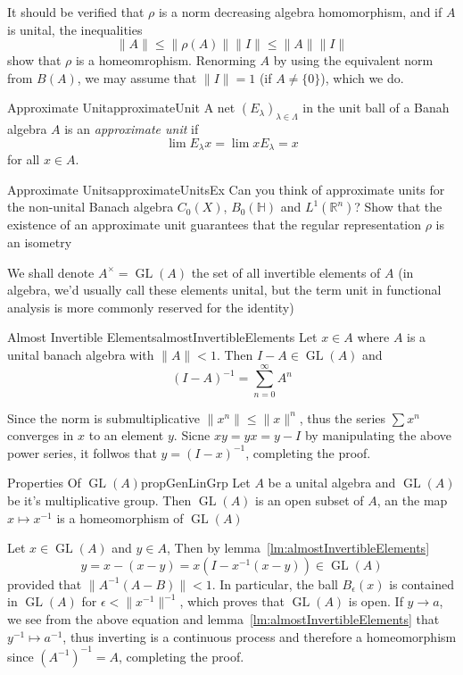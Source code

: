 \documentclass[oneside]{book}
\newcommand{\R}{\mathbb{R}}
\renewcommand{\H}{\mathbb{H}}
\newcommand{\GL}{\operatorname{GL}}
\begin{document}
It should be verified that $\rho$ is a norm decreasing algebra homomorphism, and if $A$ is unital, the inequalities
\[
	\|A\| \le \|\rho(A)\|\|I\| \le \|A\|\|I\|
\]
show that $\rho$ is a homeomrophism. Renorming $A$ by using the equivalent norm from $B(A)$, we may assume that $\|I\|
= 1$ (if $A \ne \{0\}$), which we do.


\begin{defn}{Approximate Unit}{approximateUnit}
	A net $(E_\lambda)_{\lambda \in \Lambda}$ in the unit ball of a Banah algebra $A$ is an \emph{approximate unit}
	if
	\[
		\lim E_\lambda x = \lim x E_\lambda = x
	\]
	for all $x \in A$.
\end{defn}

\begin{example}{Approximate Units}{approximateUnitsEx}
	Can you think of approximate units for the non-unital Banach algebra $C_0(X)$, $B_0(\H)$ and $L^1(\R^n)$? Show
	that the existence of an approximate unit guarantees that the regular representation $\rho$ is an isometry
\end{example}

We shall denote $A^\times = \GL(A)$ the set of all invertible elements of $A$ (in algebra, we'd usually call these
elements unital, but the term unit in functional analysis is more commonly reserved for the identity)

\begin{lem}{Almost Invertible Elements}{almostInvertibleElements}
	Let $x \in A$ where $A$ is a unital banach algebra with $\|A\| < 1$. Then $I-A \in \GL(A)$ and
	\[
		(I-A)^{-1} = \sum_{n=0}^\infty A^n
	\]
\end{lem}

\begin{Proof}
	Since the norm is submultiplicative $\|x^n\| \le \|x\|^n$, thus the series $\sum x^n$ converges in $x$ to an
	element $y$. Sicne $xy = yx = y-I$ by manipulating the above power series, it follwos that $y=  (I-x)^{-1}$, completing the proof.
\end{Proof}

\begin{prop}{Properties Of $\GL(A)$}{propGenLinGrp}
	Let $A$ be a unital algebra and $\GL(A)$ be it's multiplicative group. Then $\GL(A)$ is an open
	subset of $A$, an the map $x \mapsto x^{-1}$ is a homeomorphism of $\GL(A)$
\end{prop}

\begin{Proof}
	Let $x \in \GL(A)$ and $y \in A$, Then by lemma~\ref{lm:almostInvertibleElements}
	\[
		y = x-(x-y) = x(I-x^{-1}(x-y)) \in \GL(A)
	\]
	provided that $\|A^{-1}(A-B)\| < 1$. In particular, the ball $B_\epsilon(x)$ is contained in $\GL(A)$ for
	$\epsilon < \|x^{-1}\|^{-1}$, which proves that $\GL(A)$ is open. If $y \to a$, we see from the above equation
	and lemma~\ref{lm:almostInvertibleElements} that $y^{-1} \mapsto a^{-1}$, thus inverting is a continuous
	process and therefore a homeomorphism since $(A^{-1})^{-1} = A$, completing the proof.
\end{Proof}
\end{document}
